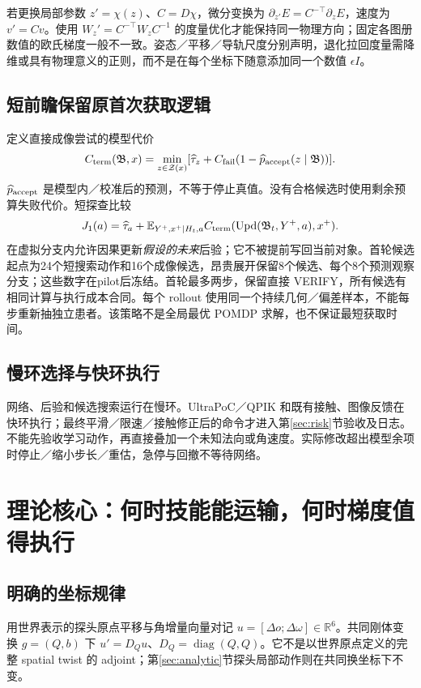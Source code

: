\documentclass[UTF8,fontset=fandol,11pt,a4paper]{ctexart}
\theoremstyle{plain}
\theoremstyle{definition}
\theoremstyle{remark}
\numberwithin{equation}{section}
\newcommand{\R}{\mathbb R}
\newcommand{\E}{\mathbb E}
\newcommand{\B}{\mathfrak B}
\newcommand{\cZ}{\mathcal Z}
\DeclareMathOperator{\diag}{diag}
\begin{document}
若更换局部参数 $z'=\chi(z)$、$C=D\chi$，微分变换为 $\partial_{z'}E=C^{-\top}\partial_zE$，速度为 $v'=Cv$。使用 $W_z'=C^{-\top}W_zC^{-1}$ 的度量优化才能保持同一物理方向；固定各图册数值的欧氏梯度一般不一致。姿态／平移／导轨尺度分别声明，退化拉回度量需降维或具有物理意义的正则，而不是在每个坐标下随意添加同一个数值 $\epsilon I$。

\subsection{短前瞻保留原首次获取逻辑}
定义直接成像尝试的模型代价
\begin{equation}
C_{\rm term}(\B,x)=\min_{z\in\cZ(x)}
[\widehat\tau_z+C_{\rm fail}(1-\widehat p_{\rm accept}(z\mid\B))].
\end{equation}
$\widehat p_{\rm accept}$ 是模型内／校准后的预测，不等于停止真值。没有合格候选时使用剩余预算失败代价。短探查比较
\begin{equation}
J_1(a)=\widehat\tau_a+
\E_{Y^+,x^+\mid H_t,a}
C_{\rm term}(\operatorname{Upd}(\B_t,Y^+,a),x^+).
\label{eq:lookahead}
\end{equation}
在虚拟分支内允许因果更新\emph{假设的未来}后验；它不被提前写回当前对象。首轮候选起点为24个短搜索动作和16个成像候选，昂贵展开保留8个候选、每个8个预测观察分支；这些数字在pilot后冻结。首轮最多两步，保留直接 VERIFY，所有候选有相同计算与执行成本合同。每个 rollout 使用同一个持续几何／偏差样本，不能每步重新抽独立患者。该策略不是全局最优 POMDP 求解，也不保证最短获取时间。

\subsection{慢环选择与快环执行}
网络、后验和候选搜索运行在慢环。UltraPoC／QPIK 和既有接触、图像反馈在快环执行；最终平滑／限速／接触修正后的命令才进入第\ref{sec:risk}节验收及日志。不能先验收学习动作，再直接叠加一个未知法向或角速度。实际修改超出模型余项时停止／缩小步长／重估，急停与回撤不等待网络。

\section{理论核心：何时技能能运输，何时梯度值得执行}
\label{sec:theory}
\subsection{明确的坐标规律}
用世界表示的探头原点平移与角增量向量对记 $u=[\Delta o;\Delta\omega]\in\R^6$。共同刚体变换 $g=(Q,b)$ 下 $u'=D_Qu$、$D_Q=\diag(Q,Q)$。它不是以世界原点定义的完整 spatial twist 的 adjoint；第\ref{sec:analytic}节探头局部动作则在共同换坐标下不变。
\end{document}
